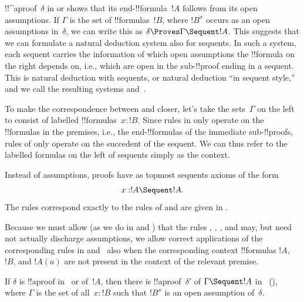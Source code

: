 \documentclass[../../../include/open-logic-section]{subfiles}
\begin{document}


!!^a{proof}~$\delta$ in  or  shows that its
end-!!{formula}~$!A$ follows from its open assumptions. If $\Gamma$ is
the set of !!{formula}s~$!B$, where $!B^x$ occurs as an open
assumptions in~$\delta$, we can write this as $\delta \Proves \Gamma
\Sequent !A$. This suggests that we can formulate a natural deduction
system also for sequents. In such a system, each sequent carries the
information of which open assumptions the !!{formula} on the right
depends on, i.e., which are open in the sub-!!{proof} ending in a
sequent. This is natural deduction with sequents, or
natural deduction ``in sequent style,'' and we call the resulting systems  and~.

To make the correspondence between  and  closer,
let's take the sets~$\Gamma$ on the left to consist of labelled
!!{formula}s~$x:!B$. Since rules in  only operate on
the !!{formula}s in the premises, i.e., the end-!!{formula}s of the
immediate sub-!!{proof}s, rules of  only operate on the
succedent of the sequent. We can thus refer to the labelled formulas
on the left of sequents simply as the context.

Instead of assumptions,  proofs have as topmost sequents
axioms of the form
\[x:!A \Sequent !A.\]
The rules correspond exactly to the rules of  and are given
in .



Because we must allow (as we do in  and ) that the
rules \Intro{\lif}, \Intro{\lnot}, \Elim{\lor}, and \Elim{\lexists}
may, but need not actually discharge assumptions, we allow correct
applications of the corresponding rules in  and~
also when the corresponding context !!{formula}s $!A$, $!B$, and
$!A(a)$ are not present in the context of the relevant premise.

\begin{prop}
If $\delta$ is !!a{proof} in~ or  of~$!A$, then
there is !!a{proof}~$\delta'$ of $\Gamma \Sequent !A$ in~
(), where $\Gamma$ is the set of all~$x:!B$ such that $!B^x$
is an open assumption of~$\delta$.
\end{prop}
\end{document}
